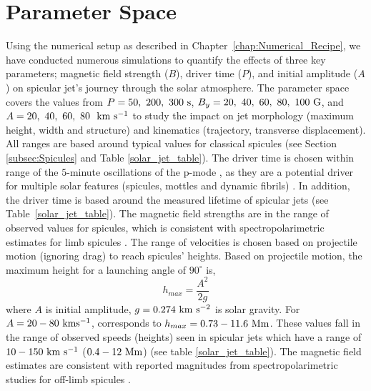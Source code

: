 \section{Parameter Space}
\label{subsec:paramater_space}
Using the numerical setup as described in Chapter~\ref{chap:Numerical_Recipe}, we have conducted numerous simulations to quantify the effects of three key parameters; magnetic field strength ($B$), driver time ($P$), and initial amplitude ($A$) on spicular jet's journey through the solar atmosphere. The parameter space covers the values from $P=50,~200,~300~\rm{s}$, $B_y=20,~40,~60,~80,~100~\rm{G}$, and $A=20,~40,~60,~80~~\rm{km ~s^{-1}}$ to study the impact on jet morphology (maximum height, width and structure) and kinematics (trajectory, transverse displacement). All ranges are based around typical values for classical spicules (see Section \ref{subsec:Spicules} and Table \ref{solar_jet_table}). The driver time is chosen within range of the $5$-minute oscillations of the p-mode \citep{Leighton1962ApJ135474L}, as they are a potential driver for multiple solar features (spicules, mottles  and dynamic fibrils) \citep{Pontieu2004Natur}. In addition, the driver time is based around the measured lifetime of spicular jets (see Table~\ref{solar_jet_table}). The magnetic field strengths are in the range of observed values for spicules, which is consistent with spectropolarimetric estimates for limb spicules \citep{centeno2010, suarez2015}. The range of velocities is chosen based on projectile motion (ignoring drag) to reach spicules' heights. Based on projectile motion, the maximum height for a launching angle of $90^{\circ}$ is,
\begin{equation}
h_{max} = \frac{A^2}{2g}
\end{equation}
where $A$ is initial amplitude, $g=0.274~\rm{km~s^{-2}}$ is solar gravity. For $A=20-80~\rm{km s^{-1}}$, corresponds to $h_{max}=0.73-11.6~\rm{Mm}$. These values fall in the range of observed speeds (heights) seen in spicular jets which have a range of $10-150~\rm{km ~s^{-1}}$ ($0.4-12~\rm{Mm}$) (see table \ref{solar_jet_table}). The magnetic field estimates are consistent with reported magnitudes from spectropolarimetric studies for off-limb spicules \citep{centeno2010, suarez2015}.

